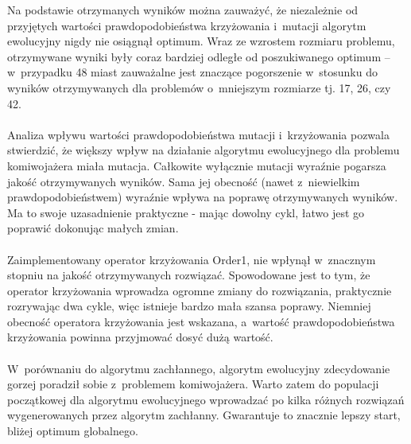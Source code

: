 \documentclass[12pt, a4paper]{article}
\begin{document}
Na podstawie otrzymanych wyników można zauważyć, że niezależnie od przyjętych wartości 
prawdopodobieństwa krzyżowania i~mutacji algorytm ewolucyjny nigdy nie osiągnął optimum.
 Wraz ze wzrostem rozmiaru problemu, otrzymywane wyniki były coraz bardziej odległe od 
poszukiwanego optimum -- w~przypadku 48 miast zauważalne jest znaczące pogorszenie w~stosunku 
do wyników otrzymywanych dla problemów o~mniejszym rozmiarze tj. 17, 26, czy 42.\\
\\
Analiza wpływu wartości prawdopodobieństwa mutacji i~krzyżowania pozwala stwierdzić, 
że większy wpływ na działanie algorytmu ewolucyjnego dla problemu komiwojażera miała mutacja. 
Całkowite wyłącznie mutacji wyraźnie pogarsza jakość otrzymywanych wyników. 
Sama jej obecność (nawet z~niewielkim prawdopodobieństwem) wyraźnie wpływa na poprawę 
otrzymywanych wyników. Ma to swoje uzasadnienie praktyczne - mając dowolny cykl, łatwo
jest go poprawić dokonując małych zmian.\\
\\
Zaimplementowany operator krzyżowania Order1, nie wpłynął w~znacznym 
stopniu na jakość otrzymywanych rozwiązać. Spowodowane jest to tym, że
operator krzyżowania wprowadza ogromne zmiany do rozwiązania, praktycznie rozrywając dwa cykle, 
więc istnieje bardzo mała szansa poprawy. Niemniej obecność operatora krzyżowania jest wskazana, 
a~wartość prawdopodobieństwa krzyżowania powinna przyjmować dosyć dużą wartość.\\
\\
W~porównaniu do algorytmu zachłannego, algorytm ewolucyjny zdecydowanie gorzej poradził sobie 
z~problemem komiwojażera. Warto zatem do populacji początkowej dla algorytmu ewolucyjnego
wprowadzać po kilka różnych rozwiązań wygenerowanych przez algorytm zachłanny. Gwarantuje to znacznie lepszy
start, bliżej optimum globalnego. 

\nocite{*}


\end{document}
